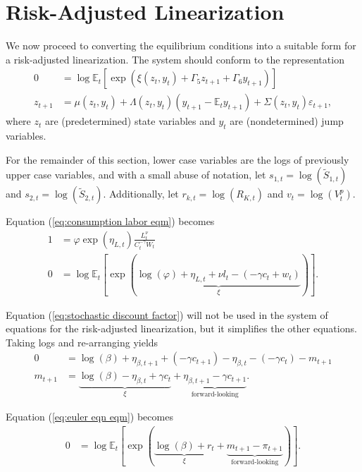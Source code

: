 \documentclass[12 pt, oneside]{article}
\theoremstyle{definition}
\theoremstyle{definition}
\theoremstyle{definition}
\newcommand{\E}{\mathbb{E}}
\newcommand{\fd}{\vspace{2.5mm}}
\begin{document}
\section{Risk-Adjusted Linearization}\label{sec:ral}

We now proceed to converting the equilibrium conditions into a suitable form for a risk-adjusted linearization. The system should conform to the representation
\begin{align*}
  0 & = \log \E_t\left[\exp\left(\xi(z_t, y_t) + \Gamma_5 z_{t + 1} + \Gamma_6 y_{t + 1}\right)\right]\\
  z_{t + 1} & = \mu(z_t, y_t) + \Lambda(z_t, y_t) (y_{t + 1} - \E_t y_{t + 1}) + \Sigma(z_t, y_t) \varepsilon_{t + 1},
\end{align*}
where $z_t$ are (predetermined) state variables and $y_t$ are (nondetermined) jump variables.

For the remainder of this section, lower case variables are the logs of previously upper case variables, and with a small abuse of notation, let $s_{1, t} = \log(\tilde{S}_{1, t})$ and $s_{2, t} = \log(\tilde{S}_{2, t})$. Additionally, let $r_{k, t} = \log(R_{K, t})$ and $v_t = \log(V_t^p)$.

\fd

Equation (\ref{eq:consumption labor eqm}) becomes
\begin{align*}
  1 & = \varphi \exp(\eta_{L, t})\frac{L_t^\nu}{C_t^{-\gamma}W_t}\\
  0 & = \log \E_t\left[\exp\left(\underbrace{\log(\varphi) + \eta_{L, t} + \nu l_t - (- \gamma c_t + w_t)}_{\xi}\right)\right].
\end{align*}

Equation (\ref{eq:stochastic discount factor}) will not be used in the system of equations for the risk-adjusted linearization,
but it simplifies the other equations. Taking logs and re-arranging yields
\begin{align*}
  0 & =  \log(\beta) + \eta_{\beta, t + 1} + (-\gamma c_{t + 1}) - \eta_{\beta, t} - (-\gamma c_t) - m_{t + 1}\\
  m_{t + 1}  & = \underbrace{\log(\beta) -\eta_{\beta, t} + \gamma c_t}_{\xi} + \underbrace{\eta_{\beta, t + 1} - \gamma c_{t + 1}}_{\text{forward-looking}}.
\end{align*}

Equation (\ref{eq:euler eqn eqm}) becomes
\begin{align*}
  0 & = \log\E_t\left[\exp\left(\underbrace{\log(\beta) + r_t}_{\xi} + \underbrace{m_{t + 1} - \pi_{t + 1}}_{\text{forward-looking}}  \right)\right].
\end{align*}
\end{document}
